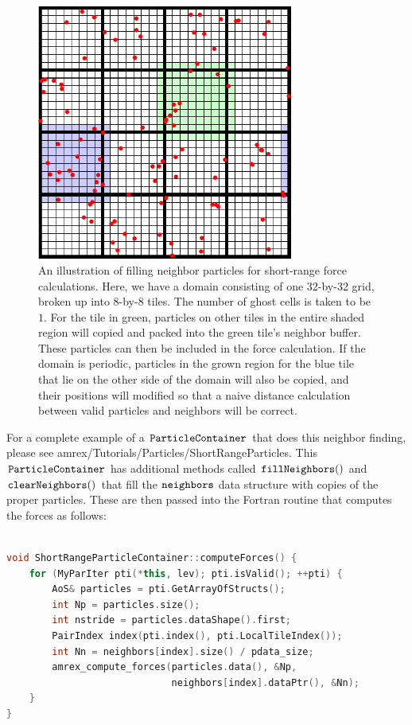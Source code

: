 \begin{figure}
  \centering
  \includegraphics[width=0.75\textwidth]{./Particle/neighbor_particles.pdf}
  \caption{\label{fig:particles:neighbor_particles} An illustration of filling neighbor particles for short-range force calculations. Here, we have a domain consisting of one 32-by-32 grid, broken up into 8-by-8 tiles. The number of ghost cells is taken to be $1$. For the tile in green, particles on other tiles in the entire shaded region will copied and packed into the green tile's neighbor buffer. These particles can then be included in the force calculation. If the domain is periodic, particles in the grown region for the blue tile that lie on the other side of the domain will also be copied, and their positions will modified so that a naive distance calculation between valid particles and neighbors will be correct.
}
\end{figure}

For a complete example of a $\tt{ParticleContainer}$ that does this neighbor finding, please see amrex/Tutorials/Particles/ShortRangeParticles. This $\tt{ParticleContainer}$ has additional methods called $\tt{fillNeighbors()}$ and $\tt{clearNeighbors()}$ that fill the $\tt{neighbors}$ data structure with copies of the proper particles. These are then passed into the Fortran routine that computes the forces as follows:

\begin{lstlisting}[language=cpp]

void ShortRangeParticleContainer::computeForces() {
    for (MyParIter pti(*this, lev); pti.isValid(); ++pti) {
        AoS& particles = pti.GetArrayOfStructs();
        int Np = particles.size();
        int nstride = particles.dataShape().first;
        PairIndex index(pti.index(), pti.LocalTileIndex());
        int Nn = neighbors[index].size() / pdata_size;
        amrex_compute_forces(particles.data(), &Np,
                             neighbors[index].dataPtr(), &Nn);
    }
}

\end{lstlisting}

